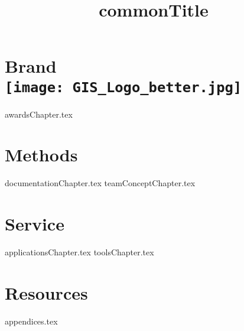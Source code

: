 \documentclass[twoside, 12pt]{memoir}  %
\title{ {commonTitle}}  %
\begin{document}
\pagestyle{empty} %
\frontmatter %
\maketitle %
\clearpage
\tableofcontents %
\clearpage
\mainmatter %
\pagestyle{fancy} %
\part[Brand]{Brand\\{\texttt{[image: GIS\_Logo\_better.jpg]}}}
{awardsChapter.tex}
\part{Methods}
{documentationChapter.tex}
{teamConceptChapter.tex}
\part{Service}
{applicationsChapter.tex}
{toolsChapter.tex}
\part{Resources}
{appendices.tex}
\backmatter %
\glsaddall %
\printglossaries %
\printindex %
\end{document}
